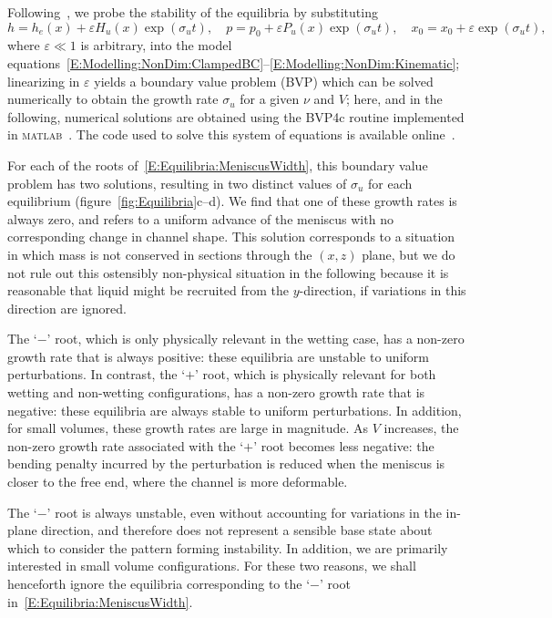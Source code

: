 \documentclass{jfm}
\renewcommand{\Pi}{P}
\renewcommand{\Lambda}{H} %
\begin{document}
Following~\citet{Taroni2012JFM}, we probe the stability of the equilibria by substituting
\begin{equation}\label{E:Equilibria:uniform_perturbation}
h = h_e(x) + \varepsilon \Lambda_u(x)\exp(\sigma_u t),\quad p = p_0 + \varepsilon \Pi_u(x)\exp(\sigma_u t),\quad x_0 = x_0 +  \varepsilon \exp(\sigma_u t),
\end{equation}
where $\varepsilon \ll 1$ is arbitrary, into the model equations~\eqref{E:Modelling:NonDim:ClampedBC}--\eqref{E:Modelling:NonDim:Kinematic}; linearizing in $\varepsilon$ yields a boundary value problem (BVP) which can be solved numerically to obtain the growth rate $\sigma_u$ for a given $\nu$ and $V$; here, and in the following, numerical solutions are obtained using the BVP4c routine implemented in \textsc{matlab}~\citep{Kierzenka2001BVP}. The code used to solve this system of equations is available online~\citet{BendocapillaryRepo}.

For each of the roots of~\eqref{E:Equilibria:MeniscusWidth}, this boundary value problem has two solutions, resulting in two distinct values of $\sigma_u$ for each equilibrium (figure~\ref{fig:Equilibria}c--d). We find that one of these growth rates is always zero, and refers to a uniform advance of the meniscus with no corresponding change in channel shape. This solution corresponds to a situation in which mass is not conserved in sections through the $(x,z)$ plane, but we do not rule out this ostensibly non-physical situation in the following because it is reasonable that liquid might be recruited from the $y$-direction, if variations in this direction are ignored.

The `$-$' root, which is only physically relevant in the wetting case, has a non-zero growth rate that is always positive: these equilibria are unstable to uniform perturbations. In contrast, the `$+$' root, which is physically relevant for both wetting and non-wetting configurations, has a non-zero growth rate that is negative: these equilibria are always stable to uniform perturbations. In addition, for small volumes, these growth rates are large in magnitude. As $V$ increases, the non-zero growth rate associated with the `$+$' root becomes less negative: the bending penalty incurred by the perturbation is reduced when the meniscus is closer to the free end, where the channel is more deformable.

The `$-$' root is always unstable, even without accounting for variations in the in-plane direction, and therefore does not represent a sensible base state about which to consider the pattern forming instability. In addition, we are primarily interested in small volume configurations. For these two reasons, we shall henceforth ignore the equilibria corresponding to the `$-$' root in~\eqref{E:Equilibria:MeniscusWidth}.
\end{document}
